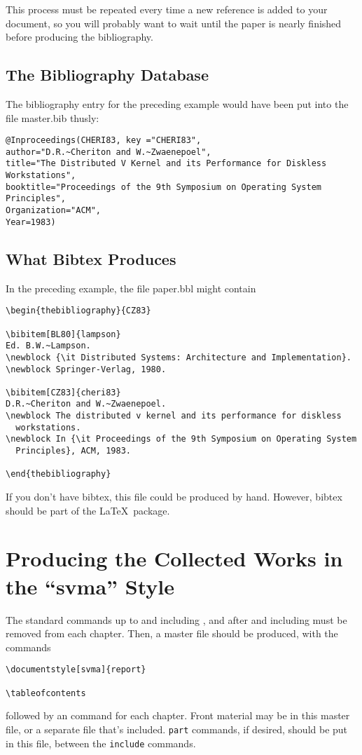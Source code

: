 This process must be repeated every time a new reference is added to
your document, so you will probably want to wait until the paper is
nearly finished before producing the bibliography.

\subsection{The Bibliography Database}
The bibliography entry for the preceding example would have been put
into the file master.bib thusly:
\begin{verbatim}
@Inproceedings(CHERI83, key ="CHERI83",
author="D.R.~Cheriton and W.~Zwaenepoel",
title="The Distributed V Kernel and its Performance for Diskless Workstations",
booktitle="Proceedings of the 9th Symposium on Operating System Principles",
Organization="ACM",
Year=1983)
\end{verbatim}
\subsection{What Bibtex Produces}

In the preceding example, the file paper.bbl might contain

\begin{verbatim}
\begin{thebibliography}{CZ83}

\bibitem[BL80]{lampson}
Ed. B.W.~Lampson.
\newblock {\it Distributed Systems: Architecture and Implementation}.
\newblock Springer-Verlag, 1980.

\bibitem[CZ83]{cheri83}
D.R.~Cheriton and W.~Zwaenepoel.
\newblock The distributed v kernel and its performance for diskless
  workstations.
\newblock In {\it Proceedings of the 9th Symposium on Operating System
  Principles}, ACM, 1983.

\end{thebibliography}
\end{verbatim}

If you don't have bibtex, this file could be produced by hand.  However,
bibtex should be part of the \LaTeX\ package.

\section{Producing the Collected Works in the ``svma'' Style}

The standard commands up to and including \verb||,
and after and including
\verb|| must be removed from each chapter.
Then, a master file should be produced, with the commands
\begin{verbatim}
\documentstyle[svma]{report}

\tableofcontents
\end{verbatim}
followed by an \verb|| command for each chapter.
Front material may be in this master file, or a separate file that's included.
\verb|part| commands, if desired, should be put in this file, between the
\verb|include| commands.

